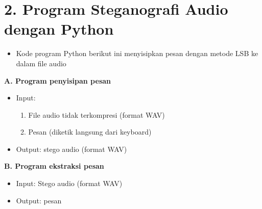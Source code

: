 \documentclass{article}
\begin{document}

\section*{2. Program Steganografi Audio dengan Python}

\begin{itemize}
    \item Kode program Python berikut ini menyisipkan pesan dengan metode LSB ke dalam file audio
\end{itemize}

\textbf{A. Program penyisipan pesan}
\begin{itemize}
    \item Input:
    \begin{enumerate}
        \item File audio tidak terkompresi (format WAV)
        \item Pesan (diketik langsung dari keyboard)
    \end{enumerate}
    \item Output: stego audio (format WAV)
\end{itemize}

\textbf{B. Program ekstraksi pesan}
\begin{itemize}
    \item Input: Stego audio (format WAV)
    \item Output: pesan
\end{itemize}
\end{document}
